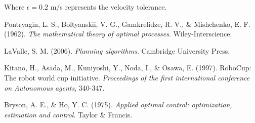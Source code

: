 \documentclass[12pt,a4paper]{article}
\begin{document}
Where $\epsilon = 0.2$ m/s represents the velocity tolerance.


\begin{thebibliography}{9}

Pontryagin, L. S., Boltyanskii, V. G., Gamkrelidze, R. V., \& Mishchenko, E. F. (1962).
\textit{The mathematical theory of optimal processes}.
Wiley-Interscience.

LaValle, S. M. (2006).
\textit{Planning algorithms}.
Cambridge University Press.

Kitano, H., Asada, M., Kuniyoshi, Y., Noda, I., \& Osawa, E. (1997).
RoboCup: The robot world cup initiative.
\textit{Proceedings of the first international conference on Autonomous agents}, 340-347.

Bryson, A. E., \& Ho, Y. C. (1975).
\textit{Applied optimal control: optimization, estimation and control}.
Taylor \& Francis.

\end{thebibliography}
\end{document}
